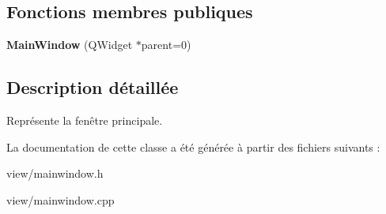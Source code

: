 \subsection*{Fonctions membres publiques}
\begin{DoxyCompactItemize}
\item 
\hypertarget{classMainWindow_a8b244be8b7b7db1b08de2a2acb9409db}{{\bfseries Main\+Window} (Q\+Widget $\ast$parent=0)}\label{classMainWindow_a8b244be8b7b7db1b08de2a2acb9409db}

\end{DoxyCompactItemize}


\subsection{Description détaillée}
Représente la fenêtre principale. 

La documentation de cette classe a été générée à partir des fichiers suivants \+:\begin{DoxyCompactItemize}
\item 
view/mainwindow.\+h\item 
view/mainwindow.\+cpp\end{DoxyCompactItemize}
